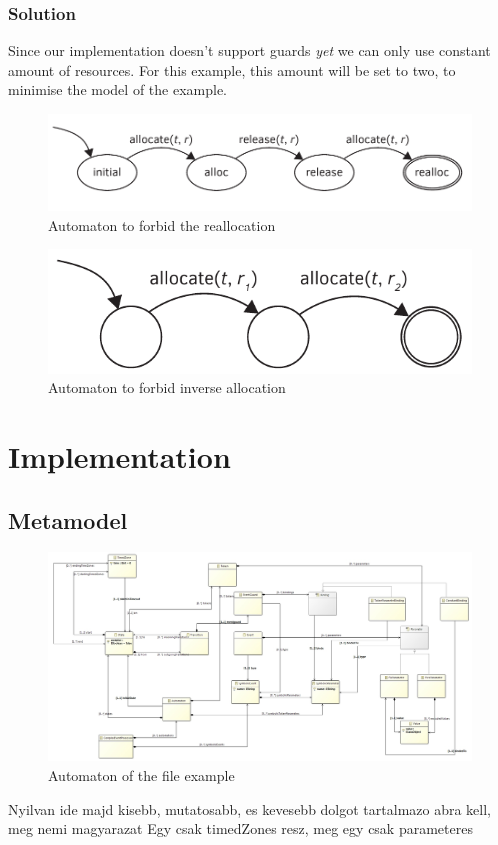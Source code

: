 			\subsubsection{Solution}
				Since our implementation doesn't support guards \emph{yet} we can only use constant amount of resources.
				For this example, this amount will be set to two, to minimise the model of the example.

				\begin{figure}[h]
				\centering
				\includegraphics[width=0.7\linewidth]{include/figures/chapter_5/mars_example_aut1}
				\caption{Automaton to forbid the reallocation}
				\label{fig:cep:marsautomaton1}
				\end{figure}		
				
				
				\begin{figure}[h]
				\centering
				\includegraphics[width=0.7\linewidth]{include/figures/chapter_5/mars_example_aut2}
				\caption{Automaton to forbid inverse allocation}
				\label{fig:cep:marsautomaton2}
				\end{figure}	

				
				
	\section{Implementation}
		\subsection{Metamodel}
		
			\begin{figure}[h]
			\centering
			\includegraphics[width=0.9\linewidth]{include/figures/chapter_5/model}
			\caption{Automaton of the file example}
			\label{fig:cep:model}
			\end{figure}
		Nyilvan ide majd kisebb, mutatosabb, es kevesebb dolgot tartalmazo abra kell, meg nemi magyarazat
		Egy csak timedZones resz, meg egy csak parameteres

